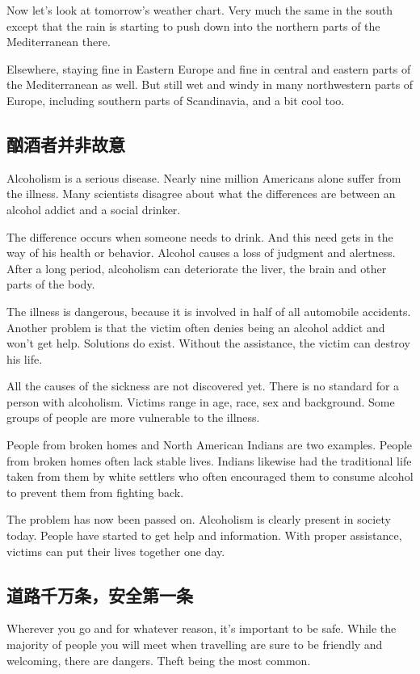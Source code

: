 Now let's look at tomorrow's weather chart. Very
much the same in the south except that the rain is starting
to push down into the northern parts of the Mediterranean
there.

Elsewhere, staying fine in Eastern Europe and fine in central
and eastern parts of the Mediterranean as well. But still
wet and windy in many northwestern parts of Europe, including
southern parts of Scandinavia, and a bit cool too.
\subsection{酗酒者并非故意}
\begin{margintable}\vspace{-2cm}\footnotesize
\end{margintable}
Alcoholism is a serious disease. Nearly nine million Americans
alone suffer from the illness. Many scientists disagree
about what the differences are between an alcohol addict
and a social drinker.

The difference occurs when someone needs to drink. And
this need gets in the way of his health or behavior. Alcohol
causes a loss of judgment and alertness. After a long
period, alcoholism can deteriorate the liver, the brain and
other parts of the body.

The illness is dangerous, because it is involved in half of all
automobile accidents. Another problem is that the
victim often denies being an alcohol addict and won't get
help. Solutions do exist. Without the assistance, the victim
can destroy his life.

All the causes of the sickness are not discovered yet.
There is no standard for a person with alcoholism. Victims
range in age, race, sex and background. Some groups of
people are more vulnerable to the illness.

People from broken homes and North American Indians
are two examples. People from broken homes often lack
stable lives. Indians likewise had the traditional life
taken from them by white settlers who often encouraged
them to consume alcohol to prevent them from fighting
back.

The problem has now been passed on. Alcoholism is
clearly present in society today. People have started to
get help and information. With proper assistance, victims
can put their lives together one day.
\subsection{道路千万条，安全第一条}
\begin{margintable}\vspace{-2cm}\footnotesize
\end{margintable}
Wherever you go and for whatever reason, it's important to
be safe. While the majority of people you will meet when
travelling are sure to be friendly and welcoming,
there are dangers. Theft being the most common.

